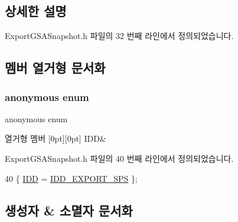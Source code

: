\subsection{상세한 설명}


Export\+G\+S\+A\+Snapshot.\+h 파일의 32 번째 라인에서 정의되었습니다.



\subsection{멤버 열거형 문서화}
\mbox{\label{class_export_g_s_a_snapshot_ab3257151782aa1db395f22cd47b06c28}} 
\subsubsection{\texorpdfstring{anonymous enum}{anonymous enum}}
{\footnotesize\ttfamily anonymous enum}

\begin{DoxyEnumFields}{열거형 멤버}
[0pt][0pt]{}\mbox{\label{class_export_g_s_a_snapshot_ab3257151782aa1db395f22cd47b06c28a85cd9fd1305aaa3351e6c2d68d18b97e}} 
I\+DD&\\
\hline

\end{DoxyEnumFields}


Export\+G\+S\+A\+Snapshot.\+h 파일의 40 번째 라인에서 정의되었습니다.


\begin{DoxyCode}
40 \{ \mbox{\hyperlink{class_export_g_s_a_snapshot_ab3257151782aa1db395f22cd47b06c28a85cd9fd1305aaa3351e6c2d68d18b97e}{IDD}} = \mbox{\hyperlink{resource_8h_a5201e5e8c74c0f24a8e5da97e8acf369}{IDD\_EXPORT\_SPS}} \};
\end{DoxyCode}


\subsection{생성자 \& 소멸자 문서화}
\mbox{\label{class_export_g_s_a_snapshot_ae7d2ef11752f80bfd3c3a13a7c1215ad}} 
